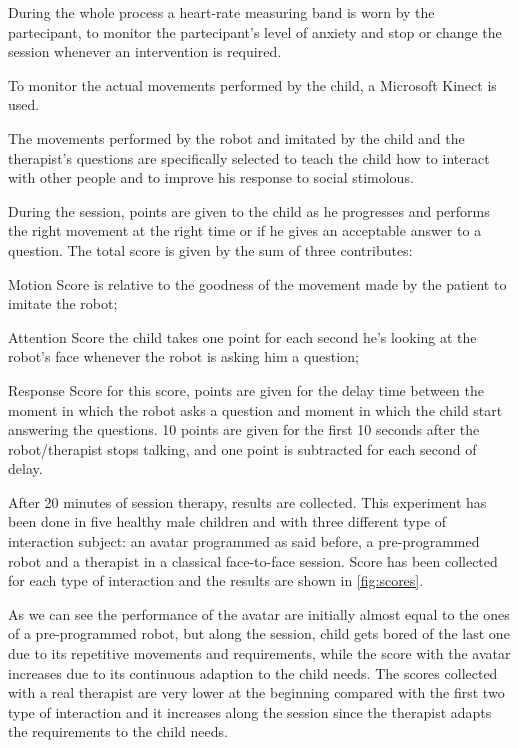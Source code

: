 \documentclass[12pt,journal,draftclsnofoot,onecolumn]{IEEEtran}
\begin{document}
During the whole process a heart-rate measuring band is worn by the partecipant, to monitor the partecipant's level of anxiety and stop or change the session whenever an intervention is required.

To monitor the actual movements performed by the child, a Microsoft Kinect is used.

The movements performed by the robot and imitated by the child and the therapist's questions are specifically selected to teach the child how to interact with other people and to improve his response to social stimolous.

During the session, points are given to the child as he progresses and performs the right movement at the right time or if he gives an acceptable answer to a question.
The total score is given by the sum of three contributes:

\begin{LaTeXdescription}
	\item[Motion Score] is relative to the goodness of the movement made by the patient to imitate the robot;
	\item[Attention Score] the child takes one point for each second he's looking at the robot’s face whenever the robot is asking him a question;
	\item[Response Score] for this score, points are given for the delay time between the moment in which the robot asks a question and moment in which the child start answering the questions.
	10 points are given for the first 10 seconds after the robot/therapist stops talking, and one point is subtracted for each second of delay.
\end{LaTeXdescription}

After 20 minutes of session therapy, results are collected.
This experiment has been done in five healthy male children and with three different type of interaction subject: an avatar programmed as said before, a pre-programmed robot and a therapist in a classical face-to-face session. Score has been collected for each type of interaction and the results are shown in \autoref{fig:scores}.

As we can see the performance of the avatar are initially almost equal to the ones of a pre-programmed robot, but along the session, child gets bored of the last one due to its repetitive movements and requirements, while the score with the avatar increases due to its continuous adaption to the child needs.
The scores collected with a real therapist are very lower at the beginning compared with the first two type of interaction and it increases along the session since the therapist adapts the requirements to the child needs.
\end{document}
